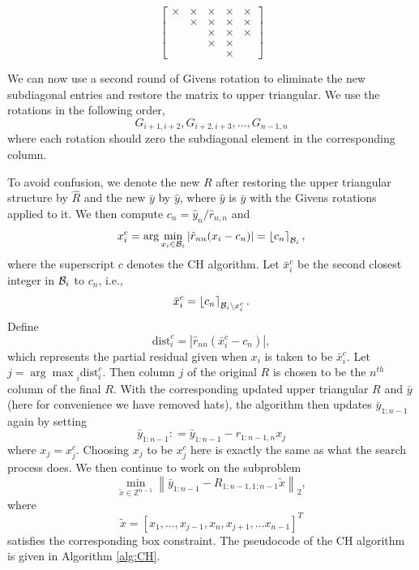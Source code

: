 \documentclass[12pt,Bold,letterpaper]{mcgilletdclass}
\newcommand{\be}{\begin{equation}}
\newcommand{\ee}{\end{equation}}
\newcommand{\dist}{\mathrm{dist}}
\begin{document}
\begin{equation} \label{eq:subDiagEntries}
\begin{bmatrix}
\times & \times & \times & \times & \times \\ 
  & \times & \times & \times & \times \\ 
  &   & \times & \times & \times \\ 
  &   & \times & \times &   \\ 
  &   &  &  \times & 
\end{bmatrix}
\end{equation}

We can now use a second round of Givens rotation to eliminate the new subdiagonal entries and restore the matrix to upper triangular. We use the rotations in the following order, $$G_{i+1,i+2}, G_{i+2,i+3}, \dots, G_{n-1,n}$$ where each rotation should zero the subdiagonal element in the corresponding column.

To avoid confusion, we denote the new $R$ after restoring the upper triangular structure by $\hat{R}$ and the new $\bar{y}$ by $\hat{y}$, where $\hat{y}$ is $\bar{y}$ with the Givens rotations applied to it.
We then compute  $c_n=\hat{y}_n/\hat{r}_{n,n}$ and 
\be
x_i^c=\arg\min_{x_i\in {\cal B}_i}\left |\hat{r}_{nn}(x_i- c_n) \right | = \left \lfloor c_n \right \rceil_{{\cal B}_i},
\label{eq:xic}
\ee
where the superscript $c$ denotes the CH algorithm. 
Let $\bar{x}_i^c$ be the second closest integer in ${{\cal B}_i}$ to $c_n$,
i.e.,  
$$\bar{x}_i^c= \left \lfloor c_n \right \rceil_{{\cal B}_i\backslash x_i^c}.$$
Define
\be
\dist_i^c = |\hat{r}_{nn}( \bar{x}_i^c -c_n) |, 
\label{eq:dic}
\ee
which represents the partial residual given when $x_i$ is taken to be $\bar{x}_i^c$.
Let $j = {\arg\max}_i \dist_i^c$.
Then  column $j$ of the original $R$ is chosen to be the $n^{th}$ column of the final $R$.
With the corresponding updated upper triangular $R$ and $\bar{y}$
(here for convenience we have removed hats),
the algorithm then updates  $\bar{y}_{1:n-1}$ again
by setting $$\bar{y}_{1:n-1}: = \bar{y}_{1:n-1} - r_{1:n-1,n}x_j$$ where $x_j=x_j^c$. 
Choosing  $x_j$ to be  $x_j^c$ here is exactly the same as what the search process does.
We then continue to work on the subproblem 
\be
\min_{\tilde{x}\in \mathbb{Z}^{n-1}} \left \| \bar{y}_{1:n-1}-R_{1:n-1,1:n-1}\tilde{x} \right \|_2,
\label{eq:subc}
\ee
where $$\tilde{x}=[x_1,\ldots, x_{j-1}, x_n, x_{j+1}, \ldots x_{n-1}]^T$$ satisfies the corresponding box constraint.
The pseudocode of the CH algorithm is given in Algorithm \ref{alg:CH}.
\end{document}

